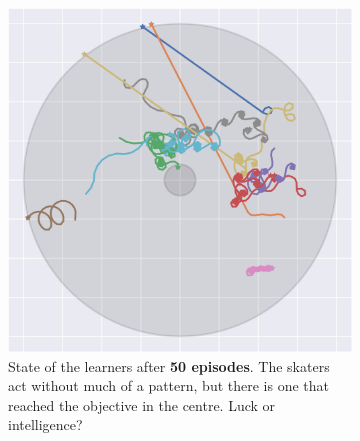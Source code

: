 \begin{figure}[H]
	\begin{subfigure}[t]{.32\textwidth}
		\includegraphics[width=\textwidth]{circle_images/image_50.png}
		\caption{State of the learners after \textbf{50 episodes}. The skaters act without much of a pattern, but there is one that reached the objective in the centre. Luck or intelligence?}
	\end{subfigure}\hfill{}
	\begin{subfigure}[t]{.32\textwidth}

\end{subfigure}
\end{figure}
